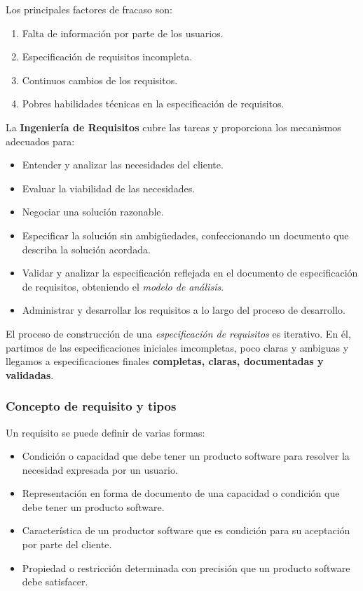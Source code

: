 \documentclass[12pt,spanish]{article}
\begin{document}
Los principales factores de fracaso son:

\begin{enumerate}
	\item Falta de información por parte de los usuarios.
	\item Especificación de requisitos incompleta.
	\item Continuos cambios de los requisitos.
	\item Pobres habilidades técnicas en la especificación de requisitos.
\end{enumerate}

La \textbf{Ingeniería de Requisitos} cubre las tareas y proporciona los mecanismos adecuados para:
\begin{itemize}
	\item Entender y analizar las necesidades del cliente.
	\item Evaluar la viabilidad de las necesidades.
	\item Negociar una solución razonable.
	\item Especificar la solución sin ambigüedades, confeccionando un documento que describa la solución acordada.
	\item Validar y analizar la especificación reflejada en el documento de especificación de requisitos, obteniendo el \emph{modelo de análisis}.
	\item Administrar y desarrollar los requisitos a lo largo del proceso de desarrollo.
\end{itemize}

El proceso de construcción de una \emph{especificación de requisitos} es iterativo. En él, partimos de las especificaciones iniciales imcompletas, poco claras y ambiguas y llegamos a especificaciones finales \textbf{completas, claras, documentadas y validadas}.

\subsubsection{Concepto de requisito y tipos}
Un requisito se puede definir de varias formas:
\begin{itemize}
	\item Condición o capacidad que debe tener un producto software para resolver la necesidad expresada por un usuario.
	\item Representación en forma de documento de una capacidad o condición que debe tener un producto software.
	\item Característica de un productor software que es condición para su aceptación por parte del cliente.
	\item Propiedad o restricción determinada con precisión que un producto software debe satisfacer.
\end{itemize}
\end{document}
